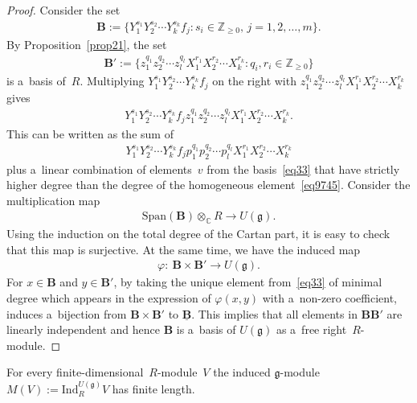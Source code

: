\documentclass[pdftex]{sigma}
\begin{document}
\begin{proof}
Consider the set
\begin{gather*}
\mathbf{B}:=\big\{Y_1^{s_1}Y_2^{s_2}\cdots Y_k^{s_k}f_j: s_i\in\mathbb{Z}_{\geq0},\, j=1,2,\dots,m\big\}.
\end{gather*}
By Proposition~\ref{prop21}, the set
\begin{gather*}
\mathbf{B}':=\big\{z_1^{q_1}z_2^{q_2}\cdots z_l^{q_l}X_1^{r_1}X_2^{r_2}\cdots X_k^{r_k}: q_i,r_i\in\mathbb{Z}_{\geq0}\big\}
\end{gather*}
is a~basis of~$R$.
Multiplying $Y_1^{s_1}Y_2^{s_2}\cdots Y_k^{s_k}f_j$ on the right with $z_1^{q_1}z_2^{q_2}\cdots
z_l^{q_l}X_1^{r_1}X_2^{r_2}\cdots X_k^{r_k}$ gives
\begin{gather*}
Y_1^{s_1}Y_2^{s_2}\cdots Y_k^{s_k}f_jz_1^{q_1}z_2^{q_2}\cdots z_l^{q_l}X_1^{r_1}X_2^{r_2}\cdots X_k^{r_k}.
\end{gather*}
This can be written as the sum of
\begin{gather}
\label{eq9745}
Y_1^{s_1}Y_2^{s_2}\cdots Y_k^{s_k}f_j p_1^{q_1}p_2^{q_2}\cdots p_l^{q_l} X_1^{r_1}X_2^{r_2}\cdots X_k^{r_k}
\end{gather}
plus a~linear combination of elements~$v$ from the basis~\eqref{eq33} that have strictly higher degree than the degree
of the homogeneous element~\eqref{eq9745}.
Consider the multiplication map
\begin{gather*}
\mathrm{Span}(\mathbf{B})\otimes_{\mathbb{C}} R\to U(\mathfrak{g}).
\end{gather*}
Using the induction on the total degree of the Cartan part, it is easy to check that this map is surjective.
At the same time, we have the induced map
\begin{gather*}
\varphi: \ \mathbf{B}\times \mathbf{B}'\to U(\mathfrak{g}).
\end{gather*}
For $x\in \mathbf{B}$ and $y\in \mathbf{B}'$, by taking the unique element from~\eqref{eq33} of minimal degree which
appears in the expression of $\varphi(x,y)$ with a~non-zero coef\/f\/icient, induces a~bijection from $\mathbf{B}\times
\mathbf{B}'$ to $\underline{\mathbf{B}}$.
This implies that all elements in $\mathbf{B}\mathbf{B}'$ are linearly independent and hence $\mathbf{B}$ is a~basis of
$U(\mathfrak{g})$ as a~free right~$R$-module.
\end{proof}

\begin{proposition}
\label{prop28}
For every finite-dimensional~$R$-module~$V$ the induced $\mathfrak{g}$-module $M(V):=\mathrm{Ind}^{U(\mathfrak{g})}_R V$
has finite length.
\end{proposition}
\end{document}
